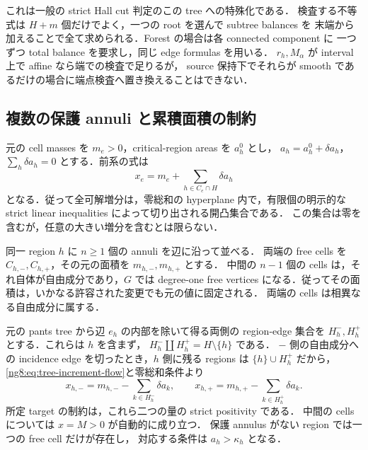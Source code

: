 これは一般の strict Hall cut 判定のこの tree への特殊化である．
検査する不等式は $H+m$ 個だけでよく，一つの root を選んで subtree balances を
末端から加えることで全て求められる．Forest の場合は各 connected component に
一つずつ total balance を要求し，同じ edge formulas を用いる．
$r_h,M_\alpha$ が interval 上で affine なら端での検査で足りるが，
source 保持下でそれらが smooth であるだけの場合に端点検査へ置き換えることはできない．

\subsection{複数の保護 annuli と累積面積の制約}

元の cell masses を $m_e>0$，critical-region areas を $a_h^0$ とし，
$a_h=a_h^0+\delta a_h$，$\sum_h\delta a_h=0$ とする．前系の式は
\begin{equation}\label{ng8:eq:tree-increment-flow}
 x_e=m_e+\sum_{h\in C_e\cap H}\delta a_h
\end{equation}
となる．従って全可解増分は，零総和の hyperplane 内で，有限個の明示的な
strict linear inequalities によって切り出される開凸集合である．
この集合は零を含むが，任意の大きい増分を含むとは限らない．

同一 region $h$ に $n\ge1$ 個の annuli を辺に沿って並べる．
両端の free cells を $C_{h,-},C_{h,+}$，その元の面積を $m_{h,-},m_{h,+}$ とする．
中間の $n-1$ 個の cells は，それ自体が自由成分であり，$G$ では degree-one
free vertices になる．従ってその面積は，いかなる許容された変更でも元の値に固定される．
両端の cells は相異なる自由成分に属する．

元の pants tree から辺 $e_h$ の内部を除いて得る両側の region-edge 集合を
$H_h^-,H_h^+$ とする．これらは $h$ を含まず，
$H_h^-\coprod H_h^+=H\setminus\{h\}$ である．
$-$ 側の自由成分への incidence edge を切ったとき，$h$ 側に残る regions は
$\{h\}\cup H_h^+$ だから，\eqref{ng8:eq:tree-increment-flow}と零総和条件より
\begin{equation}\label{ng8:eq:two-end-cells}
 x_{h,-}=m_{h,-}-\sum_{k\in H_h^-}\delta a_k,
 \qquad
 x_{h,+}=m_{h,+}-\sum_{k\in H_h^+}\delta a_k.
\end{equation}
所定 target の制約は，これら二つの量の strict positivity である．
中間の cells については $x=M>0$ が自動的に成り立つ．
保護 annulus がない region では一つの free cell だけが存在し，
対応する条件は $a_h>\kappa_h$ となる．


